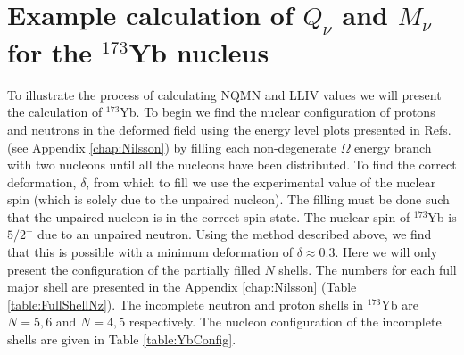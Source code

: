 \documentclass[10pt,a4paper, twoside, openright]{report}
\begin{document}
\section{Example calculation of $Q_{\nu}$ and $M_{\nu}$ for the $^{173}$Yb nucleus}
To illustrate the process of calculating NQMN and LLIV values we will present the calculation of $^{173}$Yb. To begin we find the nuclear configuration of protons and neutrons in the deformed field using the energy level plots presented in Refs. \cite{Nilsson1955,BohrMottVol2} (see Appendix \ref{chap:Nilsson}) by filling each non-degenerate $\Omega$ energy branch with two nucleons until all the nucleons have been distributed. To find the correct deformation, $\delta$, from which to fill we use the experimental value of the nuclear spin (which is solely due to the unpaired nucleon). The filling must be done such that the unpaired nucleon is in the correct spin state. The nuclear spin of $^{173}$Yb is $5/2^{-}$ due to an unpaired neutron. Using the method described above, we find that this is possible with a minimum deformation of $\delta \approx 0.3$. Here we will only present the configuration of the partially filled $N$ shells. The numbers for each full major shell are presented in the Appendix \ref{chap:Nilsson} (Table \ref{table:FullShellNz}). The incomplete neutron and proton shells in $^{173}$Yb are $N = 5,6$ and $N = 4,5$ respectively. The nucleon configuration of the incomplete shells are given in Table \ref{table:YbConfig}.
\end{document}

